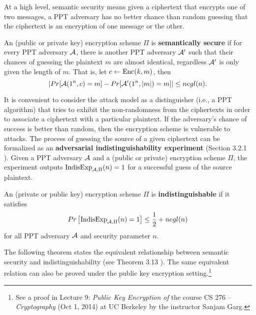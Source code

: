 \documentclass[../main.tex]{subfiles}
\begin{document}
At a high level, semantic security means given a ciphertext that encrypts one of two messages, a PPT adversary has no better chance than random guessing that the ciphertext is an encryption of one message or the other. 

\begin{definition}
	\label{def:semSec}
	\reversemarginpar
	An (public or private key) encryption scheme $\Pi$ is \textbf{semantically secure}  if for every PPT adversary $\mathcal{A}$, there is another PPT adversary $\mathcal{A}'$ such that their chances of guessing the plaintext $m$ are almost identical, regardless $\mathcal{A}'$ is only given the length of $m$. That is, let $c \leftarrow \text{Enc}(k,m)$, then
	\begin{equation*}
	\left|Pr[\mathcal{A}(1^n, c)=m] - Pr[\mathcal{A}'(1^n, |m|)=m]\right| \le negl(n).
	\end{equation*}
\end{definition}

It is convenient to consider the attack model as a distinguisher (i.e., a PPT algorithm) that tries to exhibit the non-randomness from the ciphertexts in order to associate a ciphertext with a particular plaintext. If the adversary's chance of success is better than random, then the encryption scheme is vulnerable to attacks. The process of guessing the source of a given ciphertext can be formalized as an \textbf{adversarial indistinguishability experiment}  (Section 3.2.1 \cite{katz2014introduction}). Given a PPT adversary $\mathcal{A}$ and a (public or private) encryption scheme $\Pi$, the experiment outputs $\text{IndisExp}_{\mathcal{A}, \Pi}(n)=1$ for a successful guess of the source plaintext. 

\begin{definition}
	An (private or public key) encryption scheme $\Pi$ is 
	\reversemarginpar
	\textbf{indistinguishable}  if it satisfies 
	\begin{equation*}
	Pr\left[\text{IndisExp}_{\mathcal{A}, \Pi}(n)=1\right] \le \frac{1}{2} + negl(n)
	\end{equation*}
	for all PPT adversary $\mathcal{A}$ and security parameter $n$.
\end{definition}

The following theorem states the equivalent relationship between semantic security and indistinguishability (see Theorem 3.13 \citep{katz2014introduction}). The same equivalent relation can also be proved under the public key encryption setting.\footnote{See a proof in Lecture 9: \textit{Public Key Encryption of} the course CS 276 – \textit{Cryptography} (Oct 1, 2014) at UC Berkeley by the instructor Sanjam Garg.}
\end{document}
